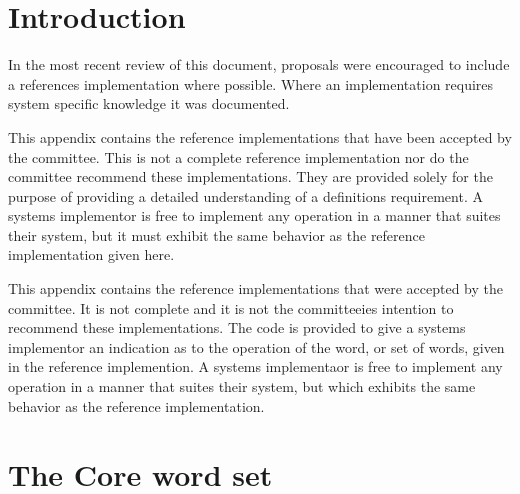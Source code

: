 \label{annex:implement}

\section{Introduction} %

\cbstart
In the most recent review of this document, proposals were encouraged
to include a references implementation where possible.  Where an
implementation requires system specific knowledge it was documented.


This appendix contains the reference implementations that have been
accepted by the committee.  This is not a complete reference
implementation nor do the committee recommend these implementations.
They are provided solely for the purpose of providing a detailed
understanding of a definitions requirement.  A systems implementor is
free to implement any operation in a manner that suites their system,
but it must exhibit the same behavior as the reference implementation
given here.

This appendix contains the reference implementations that were
accepted by the committee.  It is not complete and it is not the
committeeies intention to recommend these implementations.
The code is provided to give a systems implementor an indication as
to the operation of the word, or set of words, given in the reference
implemention.  A systems implementaor is free to implement any
operation in a manner that suites their system, but which exhibits
the same behavior as the reference implementation.
\cbend


\ifinline
	\newcommand{\impsection}[2]{%
		\section{The optional #2 word set}
		\fbox{\parbox{\linewidth}{\slshape
		In the \emph{review} (r) version of the document the
		reference implementation for a word is given in the main
		definition of the word.  The implementation of words in
		the \textbf{#1} word set will appear here in the final
		document.
		}}
	}
\else
	\newcommand{\impsection}[2]{%
		\defersection{#2}
		\setwordlist{#1}
		
		\stepsection
	}
\fi

\setcounter{section}{5}
\section{The Core word set}				%
\ifinline
\else
	
\fi

